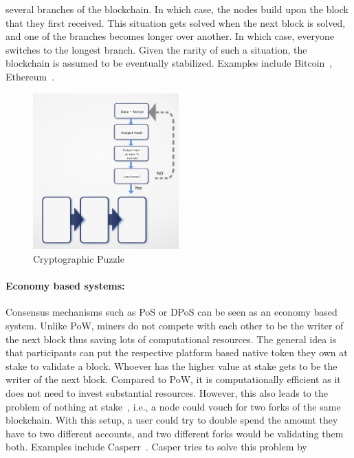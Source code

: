 several branches of the blockchain. In which case, the nodes build upon the
block that they first received. This situation gets solved when the next block
is solved, and one of the branches becomes longer over another. In which case,
everyone switches to the longest branch. Given the rarity of such a situation,
the blockchain is assumed to be eventually stabilized. Examples include
Bitcoin~\cite{Bitcoin_Satoshi}, Ethereum~\cite{buterin2013ethereum}. 
\begin{figure}
	\begin{center}
	\includegraphics[width=0.5\textwidth]{Images/CryptographicPuzzle.eps}
	\caption{Cryptographic Puzzle}
	\label{fig:cryptographicPuzzle}
	\end{center}
\end{figure} \paragraph{Economy based systems:}Consensus mechanisms such as
\ac{PoS} or \ac{DPoS} can be seen as an economy based system. Unlike \ac{PoW},
miners do not compete with each other to be the writer of the next block thus
saving lots of computational resources. The general idea is that participants
can put the respective platform based native token they own at stake to
validate a block. Whoever has the higher value at stake gets to be the writer
of the next block. Compared to PoW, it is computationally efficient as it does
not need to invest substantial resources. However, this also leads to the
problem of nothing at stake~\cite{houy2014will}, i.e., a node could vouch for
two forks of the same blockchain. With this setup, a user could try to double
spend the amount they have to two different accounts, and two different forks
would be validating them both. Examples include
Casperr~\cite{buterin2017casper}. Casper tries to solve this problem by
